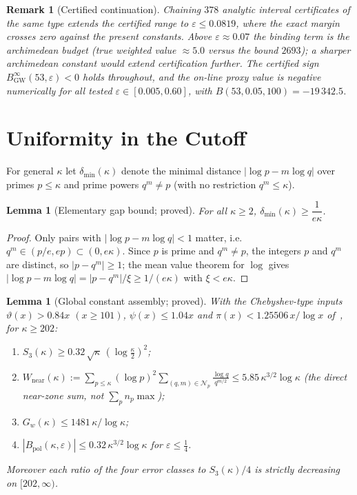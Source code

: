 \documentclass[11pt]{article}
\newtheorem{lemma}[theorem]{Lemma}
\newtheorem*{remark}{Remark}
\newcommand{\BinfGW}{B_{\mathrm{GW}}^{\infty}}   %
\newcommand{\dmin}{\delta_{\min}}           %
\begin{document}
\begin{remark}[Certified continuation]
Chaining $378$ analytic interval certificates of the same type extends the
certified range to $\varepsilon\le 0.0819$, where the exact margin crosses
zero against the present constants.
Above $\varepsilon\approx 0.07$ the binding term is the archimedean budget
(true weighted value $\approx 5.0$ versus the bound $2693$); a sharper
archimedean constant would extend certification further.
The certified sign $\BinfGW(53,\varepsilon)<0$ holds throughout, and the
on-line proxy value is negative numerically for all tested
$\varepsilon\in[0.005,0.60]$, with $B(53,0.05,100)=-19\,342.5$.
\end{remark}

\section{Uniformity in the Cutoff}
\label{sec:uniform}

For general $\kappa$ let $\dmin(\kappa)$ denote the minimal distance
$|\log p-m\log q|$ over primes $p\le\kappa$ and prime powers $q^m\ne p$
(with no restriction $q^m\le\kappa$).

\begin{lemma}[Elementary gap bound; proved]
\label{lem:gap}
For all $\kappa\ge 2$, $\dmin(\kappa)\ge\dfrac{1}{e\kappa}$.
\end{lemma}

\begin{proof}
Only pairs with $|\log p-m\log q|<1$ matter, i.e.\
$q^m\in(p/e,ep)\subset(0,e\kappa)$.
Since $p$ is prime and $q^m\ne p$, the integers $p$ and $q^m$ are distinct,
so $|p-q^m|\ge 1$; the mean value theorem for $\log$ gives
$|\log p-m\log q|=|p-q^m|/\xi\ge 1/(e\kappa)$ with $\xi<e\kappa$.
\end{proof}

\begin{lemma}[Global constant assembly; proved]\label{lem:assembly}
With the Chebyshev-type inputs $\vartheta(x)>0.84x$ $(x\ge101)$,
$\psi(x)\le1.04x$ and $\pi(x)<1.25506\,x/\log x$
of~\cite{RosserSchoenfeld62}, for $\kappa\ge202$:
\begin{enumerate}[label=\textup{(\alph*)}]
\item $S_3(\kappa)\ge 0.32\,\sqrt\kappa\,(\log\tfrac\kappa2)^2$;
\item $W_{\mathrm{near}}(\kappa):=\sum_{p\le\kappa}(\log p)^2
      \sum_{(q,m)\in\mathcal N_p}\tfrac{\log q}{q^{m/2}}
      \le 5.85\,\kappa^{3/2}\log\kappa$
      (the direct near-zone sum, \emph{not} $\sum_p n_p\max$);
\item $G_w(\kappa)\le 1481\,\kappa/\log\kappa$;
\item $|B_{\mathrm{pol}}(\kappa,\varepsilon)|\le 0.32\,\kappa^{3/2}\log\kappa$
      for $\varepsilon\le\tfrac14$.
\end{enumerate}
Moreover each ratio of the four error classes to $S_3(\kappa)/4$ is strictly
decreasing on $[202,\infty)$.
\end{lemma}
\end{document}
